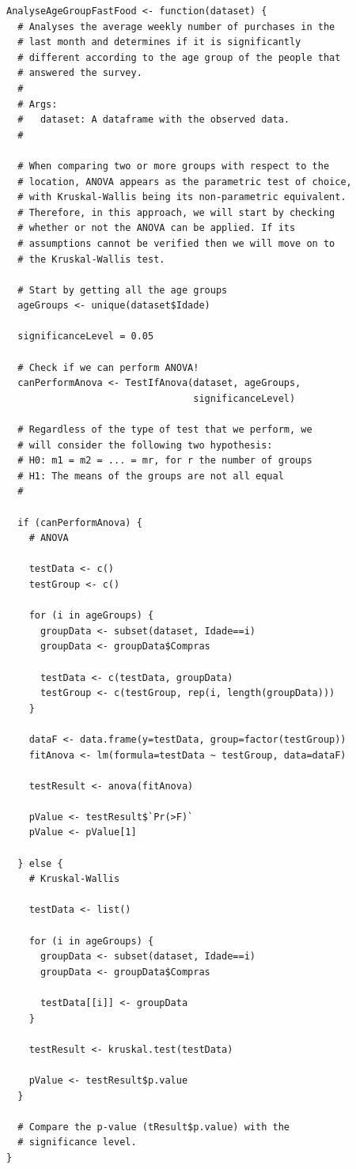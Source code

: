 \documentclass[12pt]{article}
\begin{document}
\begin{lstlisting}
AnalyseAgeGroupFastFood <- function(dataset) {
  # Analyses the average weekly number of purchases in the
  # last month and determines if it is significantly
  # different according to the age group of the people that
  # answered the survey.
  #
  # Args:
  #   dataset: A dataframe with the observed data.
  #

  # When comparing two or more groups with respect to the
  # location, ANOVA appears as the parametric test of choice,
  # with Kruskal-Wallis being its non-parametric equivalent.
  # Therefore, in this approach, we will start by checking
  # whether or not the ANOVA can be applied. If its
  # assumptions cannot be verified then we will move on to
  # the Kruskal-Wallis test.

  # Start by getting all the age groups
  ageGroups <- unique(dataset$Idade)

  significanceLevel = 0.05

  # Check if we can perform ANOVA!
  canPerformAnova <- TestIfAnova(dataset, ageGroups,
                                 significanceLevel)

  # Regardless of the type of test that we perform, we
  # will consider the following two hypothesis:
  # H0: m1 = m2 = ... = mr, for r the number of groups
  # H1: The means of the groups are not all equal
  # 

  if (canPerformAnova) {
    # ANOVA

    testData <- c()
    testGroup <- c()

    for (i in ageGroups) {
      groupData <- subset(dataset, Idade==i)
      groupData <- groupData$Compras

      testData <- c(testData, groupData)
      testGroup <- c(testGroup, rep(i, length(groupData)))
    }

    dataF <- data.frame(y=testData, group=factor(testGroup))
    fitAnova <- lm(formula=testData ~ testGroup, data=dataF)

    testResult <- anova(fitAnova)

    pValue <- testResult$`Pr(>F)`
    pValue <- pValue[1]

  } else {
    # Kruskal-Wallis

    testData <- list()

    for (i in ageGroups) {
      groupData <- subset(dataset, Idade==i)
      groupData <- groupData$Compras

      testData[[i]] <- groupData
    }

    testResult <- kruskal.test(testData)

    pValue <- testResult$p.value
  }

  # Compare the p-value (tResult$p.value) with the
  # significance level.
}
\end{lstlisting}
\end{document}
